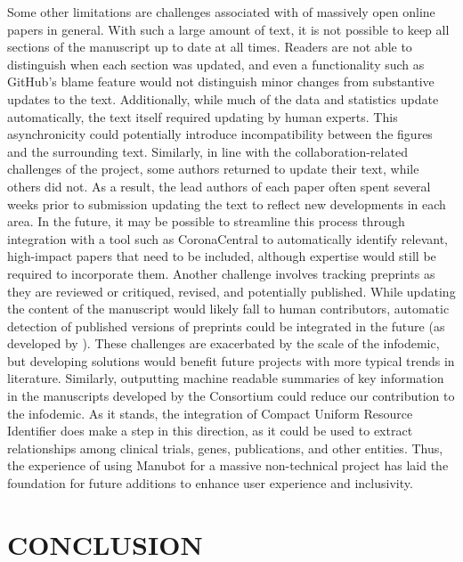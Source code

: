\documentclass[twocolumn]{ceurart}
\begin{document}
Some other limitations are challenges associated with of massively open online papers in general.
With such a large amount of text, it is not possible to keep all sections of the manuscript up to date at all times.
Readers are not able to distinguish when each section was updated, and even a functionality such as GitHub's blame feature would not distinguish minor changes from substantive updates to the text.
Additionally, while much of the data and statistics update automatically, the text itself required updating by human experts.
This asynchronicity could potentially introduce incompatibility between the figures and the surrounding text.
Similarly, in line with the collaboration-related challenges of the project, some authors returned to update their text, while others did not.
As a result, the lead authors of each paper often spent several weeks prior to submission updating the text to reflect new developments in each area.
In the future, it may be possible to streamline this process through integration with a tool such as CoronaCentral \citep{Ybg667S0} to automatically identify relevant, high-impact papers that need to be included, although expertise would still be required to incorporate them.
Another challenge involves tracking preprints as they are reviewed or critiqued, revised, and potentially published.
While updating the content of the manuscript would likely fall to human contributors, automatic detection of published versions of preprints could be integrated in the future (as developed by \citep{pESBLU4c}).
These challenges are exacerbated by the scale of the infodemic, but developing solutions would benefit future projects with more typical trends in literature.
Similarly, outputting machine readable summaries of key information in the manuscripts developed by the Consortium could reduce our contribution to the infodemic.
As it stands, the integration of Compact Uniform Resource Identifier does make a step in this direction, as it could be used to extract relationships among clinical trials, genes, publications, and other entities.
Thus, the experience of using Manubot for a massive non-technical project has laid the foundation for future additions to enhance user experience and inclusivity.

\hypertarget{conclusion}{%
\section{CONCLUSION}\label{conclusion}}
\end{document}
